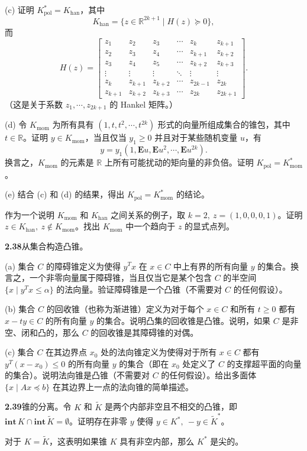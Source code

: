 \documentclass[UTF8,12pt,a4paper,fontset=fandol]{ctexart}
\begin{document}
\noindent(c) 证明 $K_{\mathrm{pol}}^*=K_{\mathrm{han}}$，其中
\[
  K_{\mathrm{han}}=\{z\in\mathbb{R}^{2k+1}\mid H(z)\succeq0\},
\]
而
\[
  H(z)=
  \begin{bmatrix}
  z_1 & z_2 & z_3 & \cdots & z_k & z_{k+1}\\
  z_2 & z_3 & z_4 & \cdots & z_{k+1} & z_{k+2}\\
  z_3 & z_4 & z_5 & \cdots & z_{k+2} & z_{k+3}\\
  \vdots & \vdots & \vdots & \ddots & \vdots & \vdots\\
  z_k & z_{k+1} & z_{k+2} & \cdots & z_{2k-1} & z_{2k}\\
  z_{k+1} & z_{k+2} & z_{k+3} & \cdots & z_{2k} & z_{2k+1}
  \end{bmatrix}.
\]
（这是关于系数 $z_1,\cdots,z_{2k+1}$ 的 Hankel 矩阵。）

\noindent(d) 令 $K_{\mathrm{mom}}$ 为所有具有 $(1,t,t^2,\cdots,t^{2k})$ 形式的向量所组成集合的锥包，其中 $t\in\mathbb{R}$。证明 $y\in K_{\mathrm{mom}}$，当且仅当 $y_1\ge0$ 并且对于某些随机变量 $u$，有
\[
  y=y_1(1,\mathbf{E}u,\mathbf{E}u^2,\cdots,\mathbf{E}u^{2k}).
\]
换言之，$K_{\mathrm{mom}}$ 的元素是 $\mathbb{R}$ 上所有可能扰动的矩向量的非负倍。证明 $K_{\mathrm{pol}}=K_{\mathrm{mom}}^*$。

\noindent(e) 结合 (c) 和 (d) 的结果，得出 $K_{\mathrm{pol}}=K_{\mathrm{mom}}^*$ 的结论。

作为一个说明 $K_{\mathrm{mom}}$ 和 $K_{\mathrm{han}}$ 之间关系的例子，取 $k=2,\ z=(1,0,0,0,1)$。证明 $z\in K_{\mathrm{han}},\ z\notin K_{\mathrm{mom}}$。找出 $K_{\mathrm{mom}}$ 中一个趋向于 $z$ 的显式点列。

\noindent\textbf{2.38}\quad [Roc70，第 15, 61 页] 从集合构造凸锥。

\noindent(a) 集合 $C$ 的障碍锥定义为使得 $y^Tx$ 在 $x\in C$ 中上有界的所有向量 $y$ 的集合。换言之，一个非零向量属于障碍锥，当且仅当它是某个包含 $C$ 的半空间 $\{x\mid y^Tx\le\alpha\}$ 的法向量。验证障碍锥是一个凸锥（不需要对 $C$ 的任何假设）。

\noindent(b) 集合 $C$ 的回收锥（也称为渐进锥）定义为对于每个 $x\in C$ 和所有 $t\ge0$ 都有 $x-ty\in C$ 的所有向量 $y$ 的集合。说明凸集的回收锥是凸锥。说明，如果 $C$ 是非空、闭和凸的，那么 $C$ 的回收锥是其障碍锥的对偶。

\noindent(c) 集合 $C$ 在其边界点 $x_0$ 处的法向锥定义为使得对于所有 $x\in C$ 都有 $y^T(x-x_0)\le0$ 的所有向量 $y$ 的集合（即在 $x_0$ 处定义了 $C$ 的支撑超平面的向量的集合）。说明法向锥是凸锥（不需要对 $C$ 的任何假设）。给出多面体 $\{x\mid Ax\preceq b\}$ 在其边界上一点的法向锥的简单描述。

\noindent\textbf{2.39}\quad 锥的分离。令 $K$ 和 $\tilde{K}$ 是两个内部非空且不相交的凸锥，即 $\mathbf{int}\,K\cap\mathbf{int}\,\tilde{K}=\emptyset$。证明存在非零 $y$ 使得 $y\in K^*,\ -y\in\tilde{K}^*$。

对于 $K=\tilde{K}$，这表明如果锥 $K$ 具有非空内部，那么 $K^*$ 是尖的。
\end{document}
